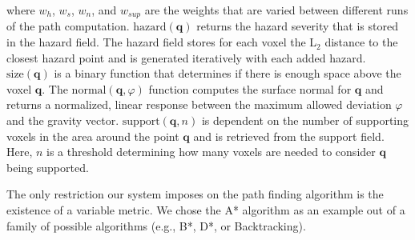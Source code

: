 \documentclass[conference,10pt,letter]{IEEEtran}
\begin{document}
\noindent where $w_h$, $w_s$, $w_n$, and $w_{sup}$ are the weights that are varied between different runs of the path computation. $\textrm{hazard}(\mathbf{q})$ returns the hazard severity that is stored in the hazard field. The hazard field stores for each voxel the L$_2$ distance to the closest hazard point and is generated iteratively with each added hazard. $\textrm{size}(\mathbf{q})$ is a binary function that determines if there is enough space above the voxel $\mathbf{q}$. The $\textrm{normal}(\mathbf{q},\varphi)$ function computes the surface normal for $\mathbf{q}$ and returns a normalized, linear response between the maximum allowed deviation $\varphi$ and the gravity vector. $\mathrm{support}(\mathbf{q},n)$ is dependent on the number of supporting voxels in the area around the point $\mathbf{q}$ and is retrieved from the support field. Here, $n$ is a threshold determining how many voxels are needed to consider $\mathbf{q}$ being supported.

The only restriction our system imposes on the path finding algorithm is the existence of a variable metric. We chose the A* algorithm as an example out of a family of possible algorithms (e.g., B*, D*, or Backtracking).
\end{document}

